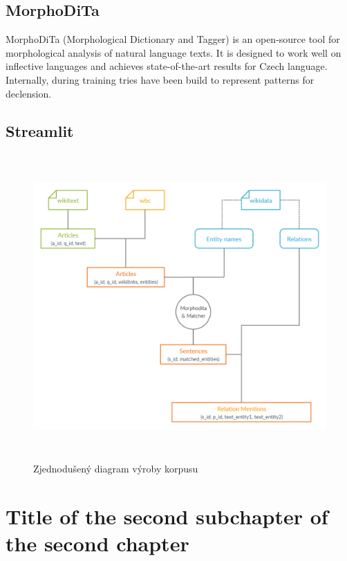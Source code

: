 \subsection{MorphoDiTa}
MorphoDiTa (Morphological Dictionary and Tagger) is an open-source tool for morphological analysis of natural language texts. It is designed to work well on inflective languages and achieves state-of-the-art results for Czech language. Internally, during training tries have been build to represent patterns for declension.  \cite{Morphodita}

\subsection{Streamlit}


\begin{figure}[p]\centering
\includegraphics[width=140mm, height=117mm]{./img/Corpus_diagram}
\caption{Zjednodušený diagram výroby korpusu}
\label{obr03:Nhust}
\end{figure}


\section{Title of the second subchapter of the second chapter}
